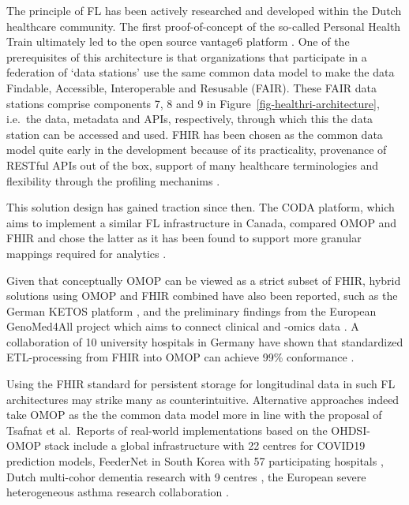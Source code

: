 \documentclass[
  authoryear]{elsarticle}
\begin{document}
The principle of FL has been actively researched and developed within
the Dutch healthcare community. The first proof-of-concept of the
so-called Personal Health Train \citep{vansoest2018using} ultimately led
to the open source vantage6 platform \citep{smits2022improved}. One of
the prerequisites of this architecture is that organizations that
participate in a federation of `data stations' use the same common data
model to make the data Findable, Accessible, Interoperable and Resusable
(FAIR). These FAIR data stations comprise components 7, 8 and 9 in
Figure~\ref{fig-healthri-architecture}, i.e.~the data, metadata and
APIs, respectively, through which this the data station can be accessed
and used. FHIR has been chosen as the common data model quite early in
the development because of its practicality, provenance of RESTful APIs
out of the box, support of many healthcare terminologies and flexibility
through the profiling mechanims \citep{choudhury2020personal}.

This solution design has gained traction since then. The CODA platform,
which aims to implement a similar FL infrastructure in Canada, compared
OMOP and FHIR and chose the latter as it has been found to support more
granular mappings required for analytics \citep{mullie2023coda}.

Given that conceptually OMOP can be viewed as a strict subset of FHIR,
hybrid solutions using OMOP and FHIR combined have also been reported,
such as the German KETOS platform \citep{gruendner2019ketos}, and the
preliminary findings from the European GenoMed4All project which aims to
connect clinical and -omics data \citep{cremonesi2023need}. A
collaboration of 10 university hospitals in Germany have shown that
standardized ETL-processing from FHIR into OMOP can achieve 99\%
conformance \citep{peng2023etlprocess}.

Using the FHIR standard for persistent storage for longitudinal data in
such FL architectures may strike many as counterintuitive. Alternative
approaches indeed take OMOP as the the common data model more in line
with the proposal of Tsafnat et al.~Reports of real-world
implementations based on the OHDSI-OMOP stack include a global
infrastructure with 22 centres for COVID19 prediction
models\citep{khalid2021standardized}, FeederNet in South Korea with 57
participating hospitals \citep{lee2022feedernet}, Dutch multi-cohor
dementia research with 9 centres \citep{mateus2024data}, the European
severe heterogeneous asthma research collaboration
\citep{kroes2022blueprint}.
\end{document}
